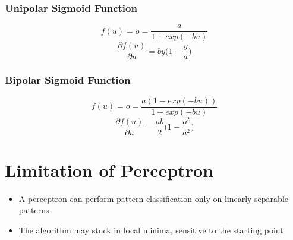\subsubsection{Unipolar Sigmoid Function}
$$f(u) = o = \frac{a}{1+exp(-bu)}$$
$$\frac{\partial f(u)}{\partial u} = by \Big(1- \frac{y}{a}\Big)$$

\subsubsection{Bipolar Sigmoid Function}
$$f(u) = o = \frac{a(1-exp(-bu))}{1+exp(-bu)}$$
$$\frac{\partial f(u)}{\partial u} = \frac{ab}{2} \Big(1-\frac{o^{2}}{a^{2}}\Big)$$

\section{Limitation of Perceptron}
\begin{itemize}
\item A perceptron can perform pattern classification only on linearly separable patterns
\item The algorithm may stuck in local minima, sensitive to the starting point
\end{itemize}
